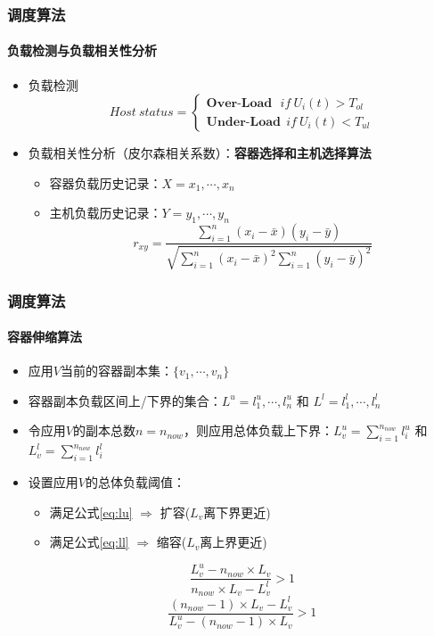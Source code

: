 \begin{frame}
\frametitle{调度算法}
\framesubtitle{负载检测与负载相关性分析}
\begin{itemize}
    \item 负载检测
    \begin{equation}
        Host\ status =
        \begin{cases}
            \textbf{Over-Load} \ \ \ if \ U_i(t) > T_{ol} \\
            \textbf{Under-Load} \ \ if\ U_i(t) < T_{ul}
        \end{cases}
    \end{equation}
    \item 负载相关性分析（皮尔森相关系数）：\textbf{容器选择和主机选择算法}
    \begin{itemize}
        \item 容器负载历史记录：$X = {x_1,\cdots,x_n}$
        \item 主机负载历史记录：$Y = {y_1,\cdots,y_n}$
        \begin{equation}
            r_{xy} = \frac{\sum_{i=1}^n(x_i - \bar{x})(y_i - \bar{y})}
            {\sqrt{\sum_{i=1}^n(x_i - \bar{x})^2\sum_{i=1}^n(y_i - \bar{y})^2}}
        \end{equation}
    \end{itemize}
\end{itemize}
\end{frame}

\begin{frame}
\frametitle{调度算法}
\framesubtitle{容器伸缩算法}
\begin{itemize}
    \item 应用$V$当前的容器副本集：$\{v_1,\cdots,v_n\}$
    \item 容器副本负载区间上/下界的集合：$L^u = {l^u_1,\cdots,l^u_n}$ 和 $L^l = {l^l_1,\cdots,l^l_n}$
    \item 令应用$V$的副本总数$n=n_{now}$，则应用总体负载上下界：$L_v^u = \sum_{i=1}^{n_{now}}l_i^u$ 和 $L_v^l = \sum_{i=1}^{n_{now}}l_i^l$
    \item 设置应用$V$的总体负载阈值：
        \begin{itemize}
            \item 满足公式\ref{eq:lu} $\Rightarrow$ 扩容($L_v$离下界更近)
            \item 满足公式\ref{eq:ll} $\Rightarrow$ 缩容($L_v$离上界更近)
        \end{itemize}
    \begin{equation}
        \frac{L_v^u - n_{now} \times L_v}{n_{now} \times L_v - L^l_v} > 1
        \label{eq:lu}
    \end{equation}
    \begin{equation}
        \frac{(n_{now} - 1) \times L_v - L_v^l}{L_v^u - (n_{now} - 1) \times L_v} > 1
        \label{eq:ll}
    \end{equation}
\end{itemize}
\end{frame}


